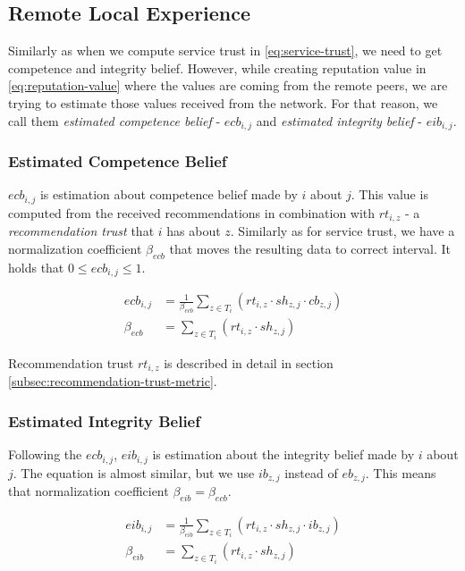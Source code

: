 \subsection{Remote Local Experience}
\label{subsec:remote-local-experience}
Similarly as when we compute service trust in \ref{eq:service-trust}, we need to get competence and integrity belief.
However, while creating reputation value in \ref{eq:reputation-value} where the values are coming from the remote peers, we are trying to estimate those values received from the network.
For that reason, we call them \textit{estimated competence belief} - $ecb_{i,j}$ and \textit{estimated integrity belief} - $eib_{i,j}$.

\subsubsection{Estimated Competence Belief}
$ecb_{i,j}$ is estimation about competence belief made by $i$ about $j$. 
This value is computed from the received recommendations in combination with $rt_{i,z}$ - a \textit{recommendation trust} that $i$ has about $z$.
Similarly as for service trust, we have a normalization coefficient $\beta_{ecb}$ that moves the resulting data to correct interval.
It holds that $0 \leq ecb_{i,j} \leq 1$.

\begin{equation}
\label{eq:estimated-competence-belief}
\begin{split}
    ecb_{i,j} &= \frac{1}{\beta_{ecb}} \sum_{z \in T_{i}} \left(rt_{i, z} \cdot sh_{z, j} \cdot cb_{z, j}\right) \\
    \beta_{ecb} &= \sum_{z \in T_{i}} \left(rt_{i, z} \cdot sh_{z, j}\right)
\end{split}
\end{equation}

\noindent
Recommendation trust $rt_{i, z}$ is described in detail in section \ref{subsec:recommendation-trust-metric}.

\subsubsection{Estimated Integrity Belief}
Following the $ecb_{i,j}$, $eib_{i,j}$ is estimation about the integrity belief made by $i$ about $j$.
The equation is almost similar, but we use $ib_{z,j}$ instead of $eb_{z,j}$.
This means that normalization coefficient $\beta_{eib} = \beta_{ecb}$.

\begin{equation}
\label{eq:estimated-integrity-belief}
\begin{split}
    eib_{i,j} &= \frac{1}{\beta_{eib}} \sum_{z \in T_{i}} \left(rt_{i, z} \cdot sh_{z, j} \cdot ib_{z, j}\right) \\
    \beta_{eib} &= \sum_{z \in T_{i}} \left(rt_{i, z} \cdot sh_{z, j}\right)
\end{split}
\end{equation}

